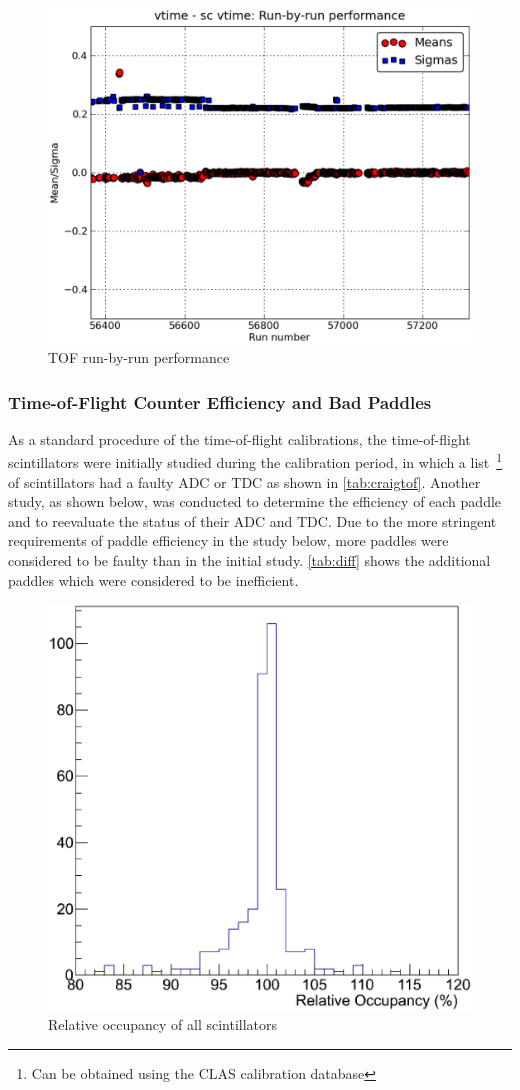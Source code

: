 \begin{figure}\begin{center}
	\includegraphics[width=.40\linewidth]{figures/calib/tof/Tof_runscan_p0v7.eps}
	\caption{TOF run-by-run performance}
	\label{plt:tofrunbyrun}
\end{center}\end{figure}

\subsubsection{\label{sec:calib.tof.eff}Time-of-Flight Counter Efficiency and Bad Paddles}

As a standard procedure of the time-of-flight calibrations, the time-of-flight scintillators were initially studied during the calibration period, in which a list~\footnote{Can be obtained using the CLAS calibration database} of scintillators had a faulty ADC or TDC as shown in \ref{tab:craigtof}. Another study, as shown below, was conducted to determine the efficiency of each paddle and to reevaluate the status of their ADC and TDC. Due to the more stringent requirements of paddle efficiency in the study below, more paddles were considered to be faulty than in the initial study. \ref{tab:diff} shows the additional paddles which were considered to be inefficient.


\begin{figure}\begin{center}
    \includegraphics[trim=0 40 10 40,clip,width=.40\linewidth]{figures/calib/tof/tofko/occp.eps}
    \caption{Relative occupancy of all scintillators}
    \label{plt:occp}
\end{center}\end{figure}

